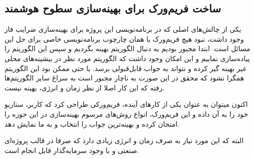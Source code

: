 \subsection{ساخت فریم‌ورک برای بهینه‌سازی سطوح هوشمند}

یکی از چالش‌های اصلی که در برنامه‌نویسی این پروژه برای بهینه‌سازی ضرایب فاز وجود داشت، نبود هیچ فریم‌ورک یا همان چارچوب برنامه‌نویسی خاصی برای حل این مسائل است. ابتدا مجبور بودیم به دنبال الگوریتم بهینه بگردیم و سپس این الگوریتم را پیاده‌سازی نماییم و این امکان وجود داشت که الگوریتم مورد نظر در بیشینه‌های محلی غیر بهینه گیر کرده و نتواند به جواب قابل‌قبولی برسد. یا حتی ممکن بود این الگوریتم همگرا نشود که محقق در این صورت به ناچار مجبور است به سراغ سایر الگوریتم‌ها رفته که این کار اصلا از نظر زمان و انرژی، بهینه نیست.

اکنون میتوان به عنوان یکی از کارهای آینده، فریم‌ورکی طراحی کرد که کاربر، سناریو خود را به آن داده و این فریم‌ورک، انواع روش‌های مرسوم بهینه‌سازی در این حوزه را امتحان کرده و بهینه‌ترین جواب را انتخاب و به ما نمایش دهد.

البته که این مورد نیاز به صرف زمان و انرژی زیادی دارد که صرفا در قالب پروژه‌ای صنعتی و با وجود سرمایه‌گذار قابل انجام است.
\newpage
‌